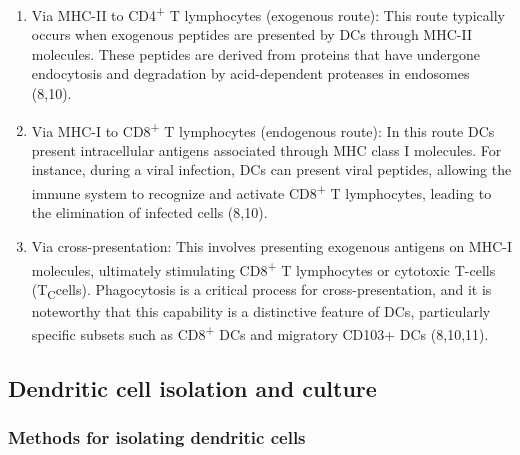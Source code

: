 \documentclass[
]{article}
\begin{document}
\begin{enumerate}
\def\labelenumi{\arabic{enumi}.}
\item
  Via MHC-II to CD4\textsuperscript{+} T lymphocytes (exogenous route):
  This route typically occurs when exogenous peptides are presented by
  DCs through MHC-II molecules. These peptides are derived from proteins
  that have undergone endocytosis and degradation by acid-dependent
  proteases in endosomes (8,10).
\item
  Via MHC-I to CD8\textsuperscript{+} T lymphocytes (endogenous route):
  In this route DCs present intracellular antigens associated through
  MHC class I molecules. For instance, during a viral infection, DCs can
  present viral peptides, allowing the immune system to recognize and
  activate CD8\textsuperscript{+} T lymphocytes, leading to the
  elimination of infected cells (8,10).
\item
  Via cross-presentation: This involves presenting exogenous antigens on
  MHC-I molecules, ultimately stimulating CD8\textsuperscript{+} T
  lymphocytes or cytotoxic T-cells (T\textsubscript{C}cells).
  Phagocytosis is a critical process for cross-presentation, and it is
  noteworthy that this capability is a distinctive feature of DCs,
  particularly specific subsets such as CD8\textsuperscript{+} DCs and
  migratory CD103+ DCs (8,10,11).
\end{enumerate}

\subsection{Dendritic cell isolation and
culture}\label{dendritic-cell-isolation-and-culture}

\subsubsection{Methods for isolating dendritic
cells}\label{methods-for-isolating-dendritic-cells}
\end{document}
